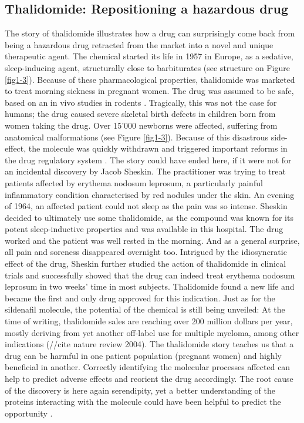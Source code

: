 \subsection{Thalidomide: Repositioning a hazardous drug}

The story of thalidomide illustrates how a drug can surprisingly come back from being a hazardous drug retracted from the market into a novel and unique therapeutic agent. The chemical started its life in 1957 in Europe, as a sedative, sleep-inducing agent, structurally close to barbiturates (see structure on Figure \ref{fig1-3}). Because of these pharmacological properties, thalidomide was marketed to treat morning sickness in pregnant women. The drug was assumed to be safe, based on an in vivo studies in rodents \citep{stephens2009dark}. Tragically, this was not the case for humans; the drug caused severe skeletal birth defects in children born from women taking the drug. Over 15’000 newborns were affected, suffering from anatomical malformations (see Figure \ref{fig1-3}). Because of this disastrous side-effect, the molecule was quickly withdrawn and triggered important reforms in the drug regulatory system \citep{stephens2009dark}. The story could have ended here, if it were not for an incidental discovery by Jacob Sheskin. The practitioner was trying to treat patients affected by erythema nodosum leprosum, a particularly painful inflammatory condition characterised by red nodules under the skin. An evening of 1964, an affected patient could not sleep as the pain was so intense. Sheskin decided to ultimately use some thalidomide, as the compound was known for its potent sleep-inductive properties and was available in this hospital. The drug worked and the patient was well rested in the morning. And as a general surprise, all pain and soreness disappeared overnight too. Intrigued by the idiosyncratic effect of the drug, Sheskin further studied the action of thalidomide in clinical trials \citep{barratt2012drug} and successfully showed that the drug can indeed treat erythema nodosum leprosum in two weeks' time in most subjects. Thalidomide found a new life and became the first and only drug approved for this indication. Just as for the sildenafil molecule, the potential of the chemical is still being unveiled: At the time of writing, thalidomide sales are reaching over 200 million dollars per year, mostly deriving from yet another off-label use for multiple myeloma, among other indications (//cite nature review 2004). The thalidomide story teaches us that a drug can be harmful in one patient population (pregnant women) and highly beneficial in another. Correctly identifying the molecular processes affected can help to predict adverse effects and reorient the drug accordingly. The root cause of the discovery is here again serendipity, yet a better understanding of the proteins interacting with the molecule could have been helpful to predict the opportunity \citep{sampaio1991thalidomide}.

